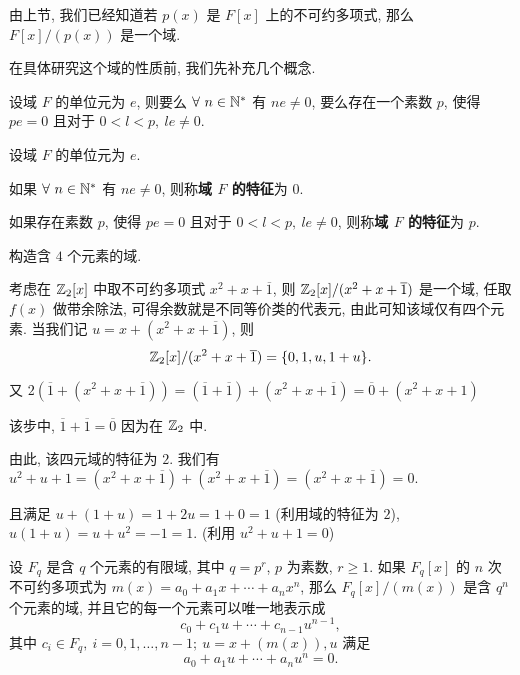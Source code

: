 由上节, 我们已经知道若 $p(x)$ 是 $F[x]$ 上的不可约多项式, 那么 $F[x]/(p(x))$ 是一个域.

在具体研究这个域的性质前, 我们先补充几个概念.


\begin{theorem}
	设域 $F$ 的单位元为 $e$, 则要么 $\forall\ n\in \mathbb N^*$ 有 $ne\neq 0$, 要么存在一个素数 $p$, 使得 $pe=0$ 且对于 $0<l<p,\ le\neq 0$.
\end{theorem}

\begin{definition}\label{域的特征}
	设域 $F$ 的单位元为 $e$.

	如果 $\forall\ n\in \mathbb N^*$ 有 $ne\neq 0$, 则称\textbf{域 $F$ 的特征}为 $0$.

	如果存在素数 $p$, 使得 $pe=0$ 且对于 $0<l<p,\ le\neq 0$, 则称\textbf{域 $F$ 的特征}为 $p$.
\end{definition}

\begin{example}\label{四元域}
	构造含 $4$ 个元素的域.

	\begin{solution}
	 考虑在 $\mathbb Z_2[x]$ 中取不可约多项式 $x^2+x+\overline{1}$, 则 $\mathbb Z_2[x]/(x^2+x+\overline{1})$ 是一个域, 任取 $f(x)$ 做带余除法, 可得余数就是不同等价类的代表元, 由此可知该域仅有四个元素. 当我们记 $u=x+(x^2+x+\overline{1})$, 则 $$\mathbb Z_2[x]/(x^2+x+\overline{1})=\{0,1,u,1+u\}.$$

	 又 $2(\overline{1}+(x^2+x+\overline{1}))=(\overline{1}+\overline{1})+(x^2+x+\overline{1})=\overline{0}+(x^2+x+1)$

	 该步中, $\overline{1}+\overline{1}=\overline{0}$ 因为在 $\mathbb Z_2$ 中.

	 由此, 该四元域的特征为 $2$. 我们有 $u^2+u+1=(x^2+x+\overline{1})+(x^2+x+\overline{1})=(x^2+x+\overline{1})=0.$

	 且满足 $u+(1+u)=1+2u=1+0=1$ (利用域的特征为 $2$), $u(1+u)=u+u^2=-1=1$. (利用 $u^2+u+1=0$)
	\end{solution}
\end{example}

\begin{theorem}
	设 $F_q$ 是含 $q$ 个元素的有限域, 其中 $q=p^r$, $p$ 为素数, $r\geqslant 1$. 如果 $F_q[x]$ 的 $n$ 次不可约多项式为 $m(x) = a_0+a_1x + \cdots+a_nx^n$, 那么 $F_q[x]/(m(x))$ 是含 $q^n$ 个元素的域, 并且它的每一个元素可以唯一地表示成 $$c_0+c_1u+\cdots+c_{n-1}u^{n-1},$$
	其中 $c_i\in F_q,\ i=0,1,\ldots,n-1;\ u=x+(m(x)),u$ 满足 $$a_0+a_1u+\cdots +a_nu^n = 0.$$
\end{theorem}

